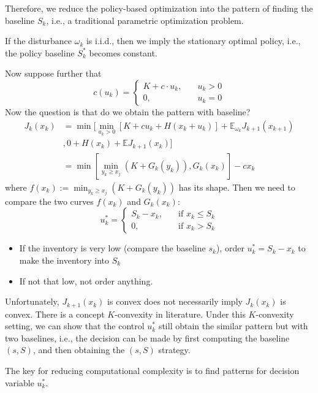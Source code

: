 Therefore, we reduce the policy-based optimization into the pattern of finding the baseline $S_k$, i.e., a traditional parametric optimization problem.

\begin{proposition}
If the disturbance $\omega_k$ is i.i.d., then we imply the stationary optimal policy, i.e., the policy baseline $S_k^*$ becomes constant.
\end{proposition}

Now suppose further that 
\[
c(u_k)
=
\left\{
\begin{aligned}
K+c\cdot u_k,&\quad u_k>0\\
0,&\quad u_k=0
\end{aligned}
\right.
\]
Now the question is that do we obtain the pattern with baseline?
\begin{align*}
J_k(x_k)
&=
\min
[
\min_{u_k>0}
[K+cu_k+H(x_k+u_k)]+\mathbb{E}_{\omega_k}J_{k+1}(x_{k+1})\\
&,
0+H(x_k)+\mathbb{E}J_{k+1}(x_k)]\\
&=\min
\left[
\min_{y_k\ge x_j}(K+G_k(y_k)), G_k(x_k)
\right] - cx_k
\end{align*}
where $f(x_k):=\min_{y_k\ge x_j}(K+G_k(y_k))$ has its shape. Then we need to compare the two curves $f(x_k)$ and $G_k(x_k)$:
\[
u_k^*
=
\left\{
\begin{aligned}
S_k-x_k,&\quad\text{if }x_k\le S_k\\
0,&\quad\text{if }x_k>S_k
\end{aligned}
\right.
\]
\begin{itemize}
\item
If the inventory is very low (compare the baseline $s_k$), order $u_k^*=S_k-x_k$ to make the inventory into $S_k$
\item
If not that low, not order anything.
\end{itemize}
\begin{remark}
Unfortunately, $J_{k+1}(x_k)$ is convex does not necessarily imply $J_k(x_k)$ is convex. There is a concept $K$-convexity in literature. Under this $K$-convexity setting, we can show that the control $u_k^*$ still obtain the similar pattern but with two baselines, i.e., the decision can be made by first computing the baseline $(s,S)$, and then obtaining the $(s,S)$ strategy.
\end{remark}

The key for reducing computational complexity is to find patterns for decision variable $u_k^*$.

